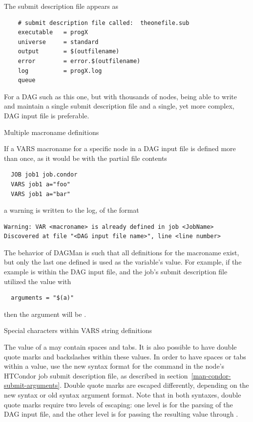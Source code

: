 The submit description file appears as 
\footnotesize
\begin{verbatim}
    # submit description file called:  theonefile.sub
    executable   = progX
    universe     = standard
    output       = $(outfilename)
    error        = error.$(outfilename)
    log          = progX.log
    queue
\end{verbatim}
\normalsize

For a DAG such as this one, but with thousands of nodes,
being able to write and maintain a single submit description file 
and a single, yet more complex, DAG input file is preferable.

\begin{description}
\item[Multiple macroname definitions]
\end{description}

If a VARS macroname for a specific node in a DAG input file is defined
more than once,
as it would be with the partial file contents
\begin{verbatim}
  JOB job1 job.condor
  VARS job1 a="foo"
  VARS job1 a="bar"
\end{verbatim}
a warning is written to the log, of the format 
\begin{verbatim}
Warning: VAR <macroname> is already defined in job <JobName>
Discovered at file "<DAG input file name>", line <line number>
\end{verbatim}

The behavior of DAGMan is such that all definitions for the macroname
exist,
but only the last one defined is used as the variable's value.
For example, if the example is within the DAG input file,
and the job's submit description file utilized the value with
\begin{verbatim}
  arguments = "$(a)"
\end{verbatim}
then the argument will be .

\begin{description}
\item[Special characters within VARS string definitions]
\end{description}

The value of a   may contain spaces and tabs.
It is also possible to have double quote marks and
backslashes within these values.
In order to have spaces or tabs within a value,
use the new syntax format for the  command
in the node's HTCondor job submit description file,
as described in section~\ref{man-condor-submit-arguments}.
Double quote marks are escaped differently,
depending on the new syntax or old syntax argument format.
Note that in both syntaxes,
double quote marks require two levels of escaping:
one level is for the parsing of the DAG input file, and the other level is for
passing the resulting value through .

